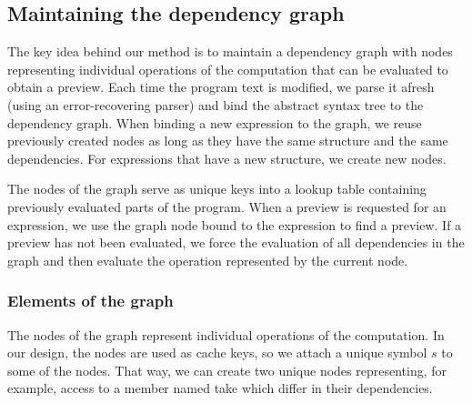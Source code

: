 \documentclass[english,crc]{programming}
\theoremstyle{plain}
\theoremstyle{definition}
\newcommand{\ident}[1]{\textnormal{\textcolor{idclr}{\sffamily #1}}}
\begin{document}

\subsection{Maintaining the dependency graph}
\label{sec:formal-deps}

The key idea behind our method is to maintain a dependency graph \cite{dependencies} with
nodes representing individual operations of the computation that can be evaluated
to obtain a preview. Each time the program text is modified, we parse it afresh (using an
error-recovering parser) and bind the abstract syntax tree to the dependency graph.
When binding a new expression to the graph, we reuse previously created nodes as long as
they have the same structure and the same dependencies. For expressions that have a new
structure, we create new nodes.

The nodes of the graph serve as unique keys into a lookup table containing previously
evaluated parts of the program. When a preview is requested for an expression, we use the graph
node bound to the expression to find a preview. If a preview has not been evaluated, we force
the evaluation of all dependencies in the graph and then evaluate the operation represented by
the current node.


\subsubsection{Elements of the graph}
The nodes of the graph represent individual operations of the computation. In our design, the nodes
are used as cache keys, so we attach a unique symbol $s$ to some of the nodes. That way, we can
create two unique nodes representing, for example, access to a member named \ident{take} which
differ in their dependencies.
\end{document}
